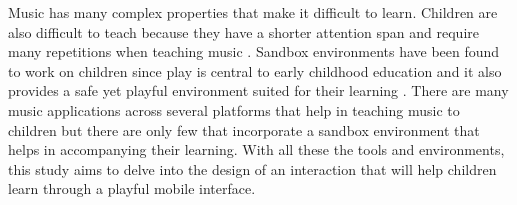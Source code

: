     Music has many complex properties that make it difficult to learn. Children are also difficult to teach because they have a shorter attention span and require many repetitions when teaching music \cite{may2013public}. Sandbox environments have been found to work on children since play is central to early childhood education and it also provides a safe yet playful environment suited for their learning \cite{bos2014learning, dalgarno2010learning}. There are many music applications across several platforms that help in teaching music to children but there are only few that incorporate a sandbox environment that helps in accompanying their learning. With all these the tools and environments, this study aims to delve into the design of an interaction that will help children learn through a playful mobile interface.



%
%



